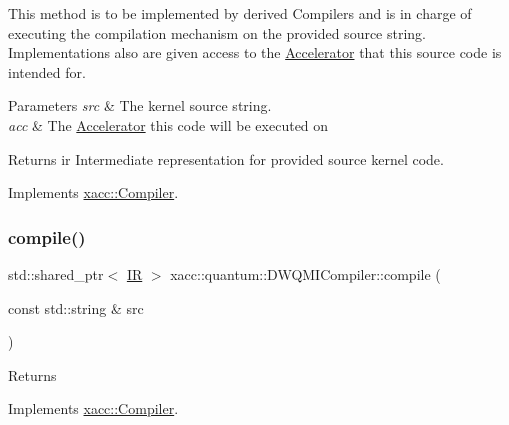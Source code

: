 This method is to be implemented by derived Compilers and is in charge of executing the compilation mechanism on the provided source string. Implementations also are given access to the \hyperlink{a01613}{Accelerator} that this source code is intended for.


\begin{DoxyParams}{Parameters}
{\em src} & The kernel source string. \\
\hline
{\em acc} & The \hyperlink{a01613}{Accelerator} this code will be executed on \\
\hline
\end{DoxyParams}
\begin{DoxyReturn}{Returns}
ir Intermediate representation for provided source kernel code. 
\end{DoxyReturn}


Implements \hyperlink{a01629_a546a40c95bb93af6a0c0ac48dbeaffc8}{xacc\+::\+Compiler}.

\mbox{\label{a01137_aa22591343b5509bf2c3a5820130ba906}} 
\subsubsection{\texorpdfstring{compile()}{compile()}\hspace{0.1cm}{\footnotesize\ttfamily [2/2]}}
{\footnotesize\ttfamily std\+::shared\+\_\+ptr$<$ \hyperlink{a01677}{IR} $>$ xacc\+::quantum\+::\+D\+W\+Q\+M\+I\+Compiler\+::compile (\begin{DoxyParamCaption}\item[{const std\+::string \&}]{src }\end{DoxyParamCaption})\hspace{0.3cm}{\ttfamily [virtual]}}

\begin{DoxyReturn}{Returns}

\end{DoxyReturn}


Implements \hyperlink{a01629_a9092f5f779b570c91569b59621280c04}{xacc\+::\+Compiler}.

\mbox{\label{a01137_aed42de96f8e0dd94b6de183f28aee419}} 
